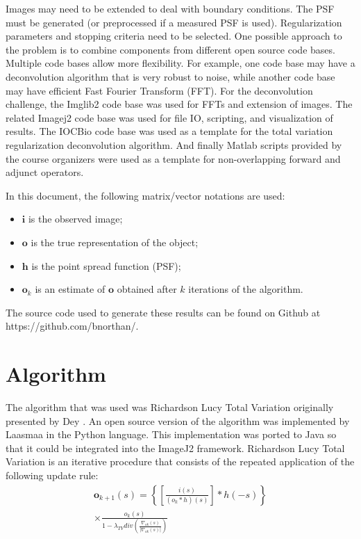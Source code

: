 \documentclass[conference,a4paper]{IEEEtran}
\begin{document}
Images may need to be extended to deal with boundary conditions.  The PSF must be generated (or preprocessed if a measured PSF is used).  Regularization parameters and stopping criteria need to be selected.  One possible approach to the problem is to combine components from different open source code bases.  Multiple code bases allow more flexibility.  For example, one code base may have a deconvolution algorithm that is very robust to noise, while another code base may have efficient Fast Fourier Transform (FFT).  For the deconvolution challenge, the Imglib2 code base \cite{imglib2012} was used for FFTs and extension of images.  The related Imagej2 code base \cite{imagej2013} was used for file IO, scripting, and visualization of results.  The IOCBio \cite{laasmaa2011} code base was used as a template for the total variation regularization deconvolution algorithm.  And finally Matlab scripts provided by the course organizers \cite{vonesch2013} were used as a template for non-overlapping forward and adjunct operators. 

In this document, the following matrix/vector notations are used:
\begin{itemize}
	\item $\mathbf{i}$ is the observed image;	
	\item $\mathbf{o}$ is the true representation of the object;
	\item $\mathbf{h}$ is the point spread function (PSF);
	\item $\mathbf{o}_k$ is an estimate of $\mathbf{o}$ obtained after $k$ iterations of the algorithm.
\end{itemize}

The source code used to generate these results can be found on Github at https://github.com/bnorthan/.

\section{Algorithm}

The algorithm that was used was Richardson Lucy Total Variation originally presented by Dey \cite{dey2006}.  An open source version of the algorithm was implemented by Laasmaa \cite{laasmaa2011} in the Python language.  This implementation was ported to Java so that it could be integrated into the ImageJ2 framework.  Richardson Lucy Total Variation is an iterative procedure that consists of the repeated application of the following update rule:
\begin{multline} \label{eq:tv_update}
	\mathbf{o}_{k+1}(s) = \left\{\left[\frac{i(s)}{(o_{k}*h)(s)}\right]*h(-s)\right\}\\\times\frac{{o}_{k}(s)}{1-\lambda_{TV}div\left({\frac{\nabla_{ok}(s)}{|\nabla_{ok}(s)|}}\right)}
\end{multline}
\end{document}
